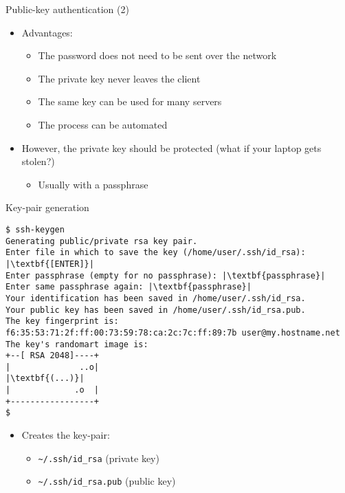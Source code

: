 \documentclass[11pt,final,usepdftitle=false]{beamer}
\newcommand{\tilda}{\textasciitilde{}}
\begin{document}
\begin{frame}{Public-key authentication (2)}
\begin{itemize}
	\item Advantages:
		\begin{itemize}
			\item The password does not need to be sent over the network
			\hbr
			\item The private key never leaves the client
				\hbr
			\item The same key can be used for many servers
			\hbr
			\item The process can be automated
		\end{itemize}
	\hbr
	\item However, the private key should be protected (what if your laptop gets stolen?)
		\begin{itemize}
			\item Usually with a passphrase
		\end{itemize}
\end{itemize}
\end{frame}

\begin{frame}[fragile]{Key-pair generation}
\begin{lstlisting}[basicstyle=\ttfamily\scriptsize,escapeinside={||}]
$ ssh-keygen
Generating public/private rsa key pair.
Enter file in which to save the key (/home/user/.ssh/id_rsa): |\textbf{[ENTER]}|
Enter passphrase (empty for no passphrase): |\textbf{passphrase}|
Enter same passphrase again: |\textbf{passphrase}|
Your identification has been saved in /home/user/.ssh/id_rsa.
Your public key has been saved in /home/user/.ssh/id_rsa.pub.
The key fingerprint is:
f6:35:53:71:2f:ff:00:73:59:78:ca:2c:7c:ff:89:7b user@my.hostname.net
The key's randomart image is:
+--[ RSA 2048]----+
|              ..o|
|\textbf{(...)}|
|             .o  |
+-----------------+
$\end{lstlisting}
\begin{itemize}
	\item Creates the key-pair:
		\begin{itemize}
			\item \texttt{\tilda/.ssh/id\_rsa} (private key)
			\item \texttt{\tilda/.ssh/id\_rsa.pub} (public key)
		\end{itemize}
\end{itemize}
\end{frame}
\end{document}
